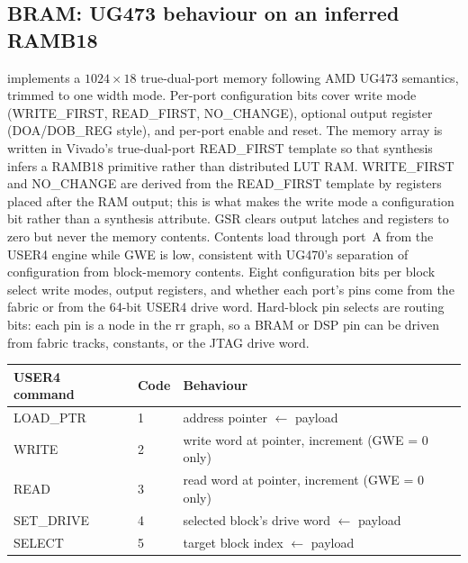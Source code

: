 \documentclass[11pt,a4paper]{article}
\newcommand{\code}[1]{\texttt{\detokenize{#1}}}
\begin{document}
\subsection{BRAM: UG473 behaviour on an inferred RAMB18}
\code{bram_core.v} implements a $1024\times18$ true-dual-port memory following
AMD UG473 semantics, trimmed to one width mode. Per-port configuration bits
cover write mode (WRITE\_FIRST, READ\_FIRST, NO\_CHANGE), optional output
register (DOA/DOB\_REG style), and per-port enable and reset. The memory array
is written in Vivado's true-dual-port READ\_FIRST template so that synthesis
infers a RAMB18 primitive rather than distributed LUT RAM. WRITE\_FIRST and
NO\_CHANGE are derived from the READ\_FIRST template by registers placed after
the RAM output; this is what makes the write mode a configuration bit rather
than a synthesis attribute.
GSR clears output latches and registers to zero but never the memory contents.
Contents load through port~A from the USER4 engine while GWE is low, consistent
with UG470's separation of configuration from block-memory contents.
Eight configuration bits per block select write modes, output registers, and
whether each port's pins come from the fabric or from the 64-bit USER4 drive
word. Hard-block pin selects are routing bits: each pin is a node in the rr
graph, so a BRAM or DSP pin can be driven from fabric tracks, constants, or the
JTAG drive word.
\begin{center}
\begin{tabular}{lll}
\toprule
USER4 command & Code & Behaviour\\\midrule
LOAD\_PTR & 1 & address pointer $\leftarrow$ payload\\
WRITE & 2 & write word at pointer, increment (GWE = 0 only)\\
READ & 3 & read word at pointer, increment (GWE = 0 only)\\
SET\_DRIVE & 4 & selected block's drive word $\leftarrow$ payload\\
SELECT & 5 & target block index $\leftarrow$ payload\\
\bottomrule
\end{tabular}
\end{center}
\end{document}
